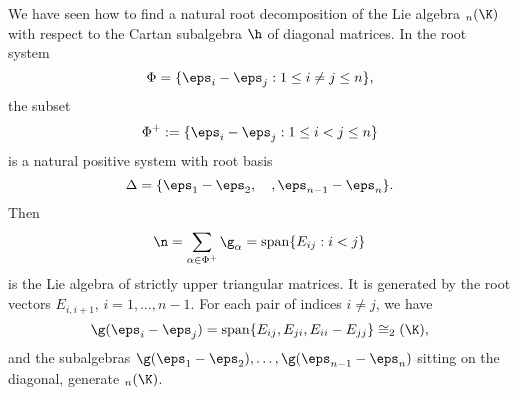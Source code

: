 \begin{example}
We have seen how to find a natural root decomposition of the Lie algebra $\sl_n(\K)$ with respect to the Cartan subalgebra $\h$ of diagonal matrices. In the root system
\[\Phi=\{\eps_i-\eps_j:1\leq i\neq j\leq n\},\]
the subset
\[\Phi^+:=\{\eps_i-\eps_j:1\leq i<j\leq n\}\]
is a natural positive system with root basis
\[\Delta=\{\eps_1-\eps_2,\quad,\eps_{n-1}-\eps_n\}.\]
Then
\[\n=\sum_{\alpha\in\Phi^+}\g_\alpha=\mathrm{span}\{E_{ij}:i<j\}\]
is the Lie algebra of strictly upper triangular matrices. It is generated by the root vectors $E_{i,i+1}$, $i=1,\dots,n-1$. For each pair of indices $i\neq j$, we have
\[\g(\eps_i-\eps_j)=\mathrm{span}\{E_{ij},E_{ji},E_{ii}-E_{jj}\}\cong\sl_2(\K),\]
and the subalgebras $\g(\eps_1-\eps_2),\dots,\g(\eps_{n-1}-\eps_n)$ sitting on the diagonal, generate $\sl_n(\K)$.
\end{example}
